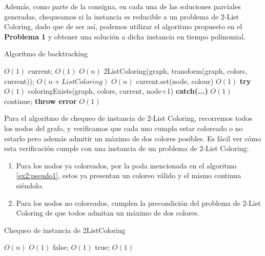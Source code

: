 \documentclass{article}
\theoremstyle{definition}
\theoremstyle{remark}
\begin{document}
Además, como parte de la consigna, en cada una de las soluciones parciales generadas, chequeamos si la instancia es reducible a un problema de 2-List Coloring, dado que de ser así, podemos utilizar el algoritmo propuesto en el \textbf{Problema 1} y obtener una solución a dicha instancia en tiempo polinomial. 

\begin{algorithm}
\caption{Algoritmo de backtracking}
\label{ex2:pseudo1}

\begin{algorithmic}
 \Comment $O(1)$
    \State \Return current; \Comment $O(1)$
\Else
     \Comment $O(n)$
        \State 2ListColoring(graph, transform(graph, colors, current)); \Comment $ O(n + List Coloring)$
    \EndIf
         \Comment $O(n)$
            \State current.set(node, colour) \Comment $O(1)$
            \State \textbf{try} \Comment $O(1)$
            \State \indent \Return coloringExists(graph, colors, current, node+1)
            \State \textbf{catch(...)} \Comment $O(1)$
            \State \indent continue;
        \EndIf
    \EndFor
    \State \textbf{throw error} \Comment $O(1)$
\EndIf
\EndFunction
\end{algorithmic}
\end{algorithm}


Para el algoritmo de chequeo de instancia de 2-List Coloring, recorremos todos los nodos del grafo, y verificamos que cada uno cumpla estar coloreado o no estarlo pero además admitir un máximo de dos colores posibles. Es fácil ver cómo esta verificación cumple con una instancia de un problema de 2-List Coloring: 
\begin{enumerate}
\item Para los nodos ya coloreados, por la poda mencionada en el algoritmo \ref{ex2:pseudo1}, estos ya presentan un coloreo válido y el mismo continua siéndolo.
\item Para los nodos no coloreados, cumplen la precondición del problema de 2-List Coloring de que todos admitan un máximo de dos colores.
\end{enumerate}


\begin{algorithm}
\caption{Chequeo de instancia de 2ListColoring}
\label{ex2:pseudo2}

\begin{algorithmic}
 \Comment $O(n)$
     \Comment $O(1)$
        \State \Return false; \Comment $O(1)$
    \EndIf
\EndFor
\State \Return true; \Comment $O(1)$
\EndFunction
\end{algorithmic}
\end{algorithm}
\end{document}
